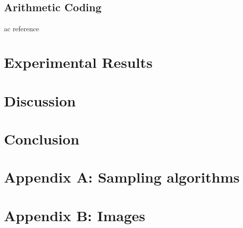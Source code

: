 \documentclass{article}
\begin{document}
\subsection{Arithmetic Coding}
\paragraph{}
ac reference \cite{rissanen1981universal}

\section{Experimental Results}

\cite{zhao2015loss}
\section{Discussion}
\section{Conclusion}

\printbibliography
\section*{Appendix A: Sampling algorithms}
\section*{Appendix B: Images}
\end{document}

